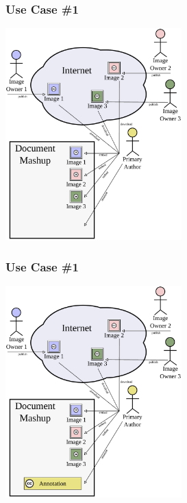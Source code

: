 \documentclass[mathserif,xcolor=dvipsnames,hyperref={bookmarks=true}]{beamer}
\begin{document}
    \begin{frame}[t]
        \frametitle{Use Case \#1}
        \begin{center}
            \includegraphics[width=0.51\textwidth]{../resources/usecases/usecase1/usecase1-step22.pdf}
        \end{center}
    \end{frame}
    \begin{frame}[t]
        \frametitle{Use Case \#1}
        \begin{center}
            \includegraphics[width=0.51\textwidth]{../resources/usecases/usecase1/usecase1-step23.pdf}
        \end{center}
    \end{frame}
\end{document}
